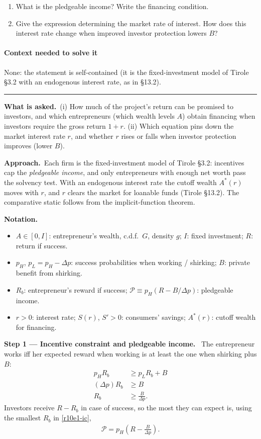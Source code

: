 \documentclass[11pt,a4paper]{article}
\newcommand{\notation}{\par\noindent\textbf{Notation.}}
\newcommand{\step}[2]{\par\medskip\noindent\textbf{Step #1 --- #2.}~}
\newcommand{\asked}{\par\medskip\noindent\textbf{What is asked.}~}
\newcommand{\approach}{\par\smallskip\noindent\textbf{Approach.}~}
\newcommand{\Pc}{\mathcal{P}}
\newcommand{\stmtend}{\par\endgroup\nopagebreak\noindent\rule{\linewidth}{0.4pt}\par\medskip}
\begin{document}
\begin{enumerate}
\def\labelenumi{(\roman{enumi})}
\item
  What is the pledgeable income? Write the financing condition.
\item
  Give the expression determining the market rate of interest. How does this interest rate change
  when improved investor protection lowers \(B\)?
\end{enumerate}

\paragraph{Context needed to solve it}

None: the statement is self-contained (it is the fixed-investment model of Tirole §3.2 with an
endogenous interest rate, as in §13.2).
\stmtend

\asked (i) How much of the project's return can be promised to investors, and which entrepreneurs (which wealth levels $A$) obtain financing when investors require the gross return $1+r$. (ii) Which equation pins down the market interest rate $r$, and whether $r$ rises or falls when investor protection improves (lower $B$).

\approach Each firm is the fixed-investment model of Tirole \S3.2: incentives cap the \emph{pledgeable income}, and only entrepreneurs with enough net worth pass the solvency test. With an endogenous interest rate the cutoff wealth $A^*(r)$ moves with $r$, and $r$ clears the market for loanable funds (Tirole \S13.2). The comparative static follows from the implicit-function theorem.

\notation
\begin{itemize}
  \item $A\in[0,I]$: entrepreneur's wealth, c.d.f.\ $G$, density $g$; $I$: fixed investment; $R$: return if success.
  \item $p_H$, $p_L=p_H-\Delta p$: success probabilities when working / shirking; $B$: private benefit from shirking.
  \item $R_b$: entrepreneur's reward if success; $\Pc\equiv p_H(R-B/\Delta p)$: pledgeable income.
  \item $r>0$: interest rate; $S(r)$, $S'>0$: consumers' savings; $A^*(r)$: cutoff wealth for financing.
\end{itemize}

\step{1}{Incentive constraint and pledgeable income} The entrepreneur works iff her expected reward when working is at least the one when shirking plus $B$:
\begin{align}
  p_HR_b &\geq p_LR_b+B \nonumber\\
  (\Delta p)R_b &\geq B \nonumber\\
  R_b &\geq \frac{B}{\Delta p}. \label{r10e1-ic}
\end{align}
Investors receive $R-R_b$ in case of success, so the most they can expect is, using the smallest $R_b$ in \eqref{r10e1-ic},
\begin{align}
  \Pc = p_H\left(R-\frac{B}{\Delta p}\right). \label{r10e1-P}
\end{align}
\end{document}
